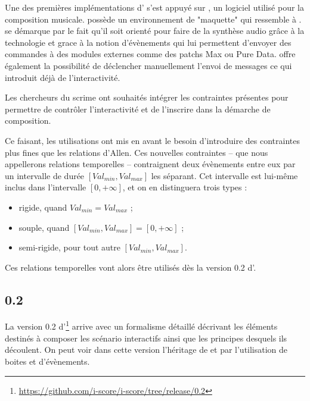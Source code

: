 Une des premières implémentations d'\iscore{} s'est appuyé sur \openmusic{}, un logiciel utilisé pour la composition musicale. \openmusic{} possède un environnement de "maquette" qui ressemble à \boxes{}. \openmusic{} se démarque par le fait qu'il soit orienté pour faire de la synthèse audio grâce à la technologie \osc{} et grace à la notion d'évènements qui lui permettent d'envoyer des commandes à des modules externes comme des patchs Max ou Pure Data. \openmusic{} offre également la possibilité de déclencher manuellement l'envoi de messages \osc{} ce qui introduit déjà de l'interactivité.

Les chercheurs du \acrshort{scrime}\cite{Scrime2015} ont souhaités intégrer les contraintes présentes \boxes{}\cite{allombert:hal-00353628} pour permettre de contrôler l'interactivité et de l'inscrire dans la démarche de composition.

Ce faisant, les utilisations ont mis en avant le besoin d'introduire des contraintes plus fines que les relations d'Allen. Ces nouvelles contraintes -- que nous appellerons relations temporelles -- contraignent deux évènements entre eux par un intervalle de durée $[Val_{min}, Val_{max}]$ les séparant. Cet intervalle est lui-même inclus dans l'intervalle $[0,+\infty]$, et on en distinguera trois types :

\begin{itemize}
\item rigide, quand $Val_{min} = Val_{max}$ ;
\item souple, quand $[Val_{min}, Val_{max}] = [0,+\infty]$ ;
\item semi-rigide, pour tout autre $[Val_{min}, Val_{max}]$.
\end{itemize}

Ces relations temporelles vont alors être utilisés dès la version 0.2 d'\iscore{}.

\subsection{\iscore{} 0.2}

La version 0.2 d'\iscore{}\footnote{\url{https://github.com/i-score/i-score/tree/release/0.2}} arrive avec un formalisme détaillé\cite{hogue2014ossia} décrivant les éléments destinés à composer les scénario interactifs ainsi que les principes desquels ils découlent. On peut voir  dans cette version l'héritage de \boxes{} et \openmusic{} par l'utilisation de boites et d'évènements.



